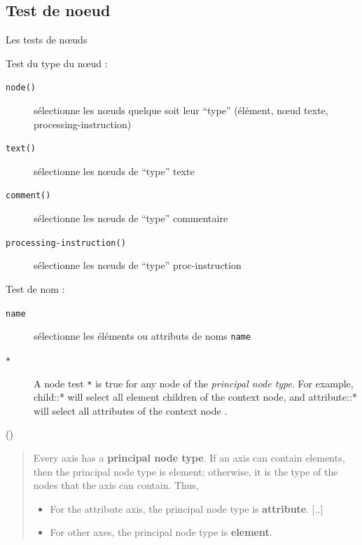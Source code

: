 \subsection{Test de n{oe}ud}

\begin{frame}{Les tests de n{\oe}uds}

Test du type du n{\oe}ud :
\begin{description}
\item[\verb?node()?] s\'electionne les nœuds quelque soit leur ``type'' (\'el\'ement, n{\oe}ud texte, processing-instruction)
\item[\verb?text()?] s\'electionne les n{\oe}uds de ``type'' texte
\item[\verb?comment()?] s\'electionne les nœuds de ``type'' commentaire
\item[\verb?processing-instruction()?] s\'electionne les nœuds de ``type'' proc-instruction
\end{description}

\medskip

Test de nom :
\begin{description}
\item[\verb?name?] s\'electionne les \'el\'ements ou attributs de noms \texttt{name}
\item[\verb?*?] A node test \verb?*? is true for any node of the \textit{principal node type}. For example, child::* will select all element children of the context node, and attribute::* will select all attributes of the context node \cite{w3c/xpath}.
\end{description}

\medskip

{\LARGE\Pointinghand} (\cite{w3c/xpath}) 
\begin{quote}
Every axis has a \textbf{principal node type}. If an axis can contain elements, then the principal node type is element; otherwise, it is the type of the nodes that the axis can contain. Thus,
\begin{itemize}
\item For the attribute axis, the principal node type is \textbf{attribute}. [..]
\item For other axes, the principal node type is \textbf{element}.
\end{itemize}
\end{quote}
\end{frame}

